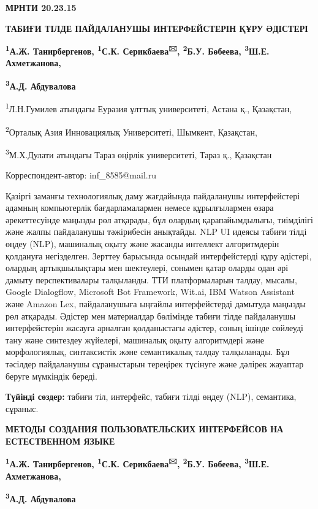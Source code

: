 \newpage
{\bfseries МРНТИ 20.23.15}

{\bfseries ТАБИҒИ ТІЛДЕ ПАЙДАЛАНУШЫ ИНТЕРФЕЙСТЕРІН ҚҰРУ ӘДІСТЕРІ}

{\bfseries \textsuperscript{1}А.Ж. Танирбергенов, \textsuperscript{1}С.К.
Серикбаева\textsuperscript{🖂}, \textsuperscript{2}Б.У. Бөбеева,
\textsuperscript{3}Ш.Е. Ахметжанова,}

{\bfseries \textsuperscript{3}А.Д. Абдувалова}

\textsuperscript{1}Л.Н.Гумилев атындағы Еуразия ұлттық университеті,
Астана қ., Қазақстан,

\textsuperscript{2}Орталық Азия Инновациялық Университеті, Шымкент,
Қазақстан,

\textsuperscript{3}М.Х.Дулати атындағы Тараз өңірлік университеті, Тараз
қ., Қазақстан

Корреспондент-автор: inf\_8585@mail.ru

Қазіргі заманғы технологиялық даму жағдайында пайдаланушы интерфейстері
адамның компьютерлік бағдарламалармен немесе құрылғылармен өзара
әрекеттесуінде маңызды рөл атқарады, бұл олардың қарапайымдылығы,
тиімділігі және жалпы пайдаланушы тәжірибесін анықтайды. NLP UI идеясы
табиғи тілді өңдеу (NLP), машиналық оқыту және жасанды интеллект
алгоритмдерін қолдануға негізделген. Зерттеу барысында осындай
интерфейстерді құру әдістері, олардың артықшылықтары мен шектеулері,
сонымен қатар оларды одан әрі дамыту перспективалары талқыланды. ТТИ
платформаларын талдау, мысалы, Google Dialogflow, Microsoft Bot
Framework, Wit.ai, IBM Watson Assistant және Amazon Lex, пайдаланушыға
ыңғайлы интерфейстерді дамытуда маңызды рөл атқарады. Әдістер мен
материалдар бөлімінде табиғи тілде пайдаланушы интерфейстерін жасауға
арналған қолданыстағы әдістер, соның ішінде сөйлеуді тану және синтездеу
жүйелері, машиналық оқыту алгоритмдері және морфологиялық, синтаксистік
және семантикалық талдау талқыланады. Бұл тәсілдер пайдаланушы
сұраныстарын тереңірек түсінуге және дәлірек жауаптар беруге мүмкіндік
береді.

{\bfseries Түйінді сөздер:} табиғи тіл, интерфейс, табиғи тілді өңдеу
(NLP), семантика, сұраныс.

{\bfseries МЕТОДЫ СОЗДАНИЯ ПОЛЬЗОВАТЕЛЬСКИХ ИНТЕРФЕЙСОВ НА ЕСТЕСТВЕННОМ
ЯЗЫКЕ}

{\bfseries \textsuperscript{1}А.Ж. Танирбергенов, \textsuperscript{1}С.К.
Серикбаева\textsuperscript{🖂}, \textsuperscript{2}Б.У. Бөбеева,
\textsuperscript{3}Ш.Е. Ахметжанова,}

{\bfseries \textsuperscript{3}А.Д. Абдувалова}

